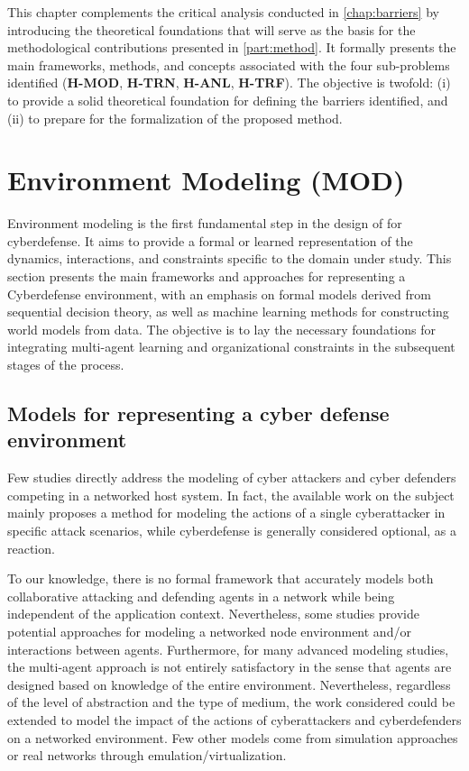 \noindent
This chapter complements the critical analysis conducted in \autoref{chap:barriers} by introducing
the theoretical foundations that will serve as the basis for the methodological contributions
presented in \autoref {part:method}.
It formally presents the main frameworks, methods, and concepts
associated with the four sub-problems identified (\textbf{H-MOD}, \textbf{H-TRN}, \textbf{H-ANL}, \textbf{H-TRF}).
%
The objective is twofold:
(i) to provide a solid theoretical foundation for defining the barriers identified, and
(ii) to prepare for the formalization of the proposed method.

\section{Environment Modeling (MOD)}

\noindent
Environment modeling is the first fundamental step in the design of  for cyberdefense. It aims to provide a formal or learned representation of the dynamics, interactions, and constraints specific to the domain under study. This section presents the main frameworks and approaches for representing a Cyberdefense environment, with an emphasis on formal models derived from sequential decision theory, as well as machine learning methods for constructing world models from data. The objective is to lay the necessary foundations for integrating multi-agent learning and organizational constraints in the subsequent stages of the process.

\subsection{Models for representing a cyber defense environment}

Few studies directly address the modeling of cyber attackers and cyber defenders competing in a networked host system. In fact, the available work on the subject mainly proposes a method for modeling the actions of a single cyberattacker in specific attack scenarios, while cyberdefense is generally considered optional, as a reaction.

To our knowledge, there is no formal framework that accurately models both collaborative attacking and defending agents in a network while being independent of the application context.
Nevertheless, some studies provide potential approaches for modeling a networked node environment and/or interactions between agents.
Furthermore, for many advanced modeling studies, the multi-agent approach is not entirely satisfactory in the sense that agents are designed based on knowledge of the entire environment.
Nevertheless, regardless of the level of abstraction and the type of medium, the work considered could be extended to model the impact of the actions of cyberattackers and cyberdefenders on a networked environment.
Few other models come from simulation approaches or real networks through emulation/virtualization.


